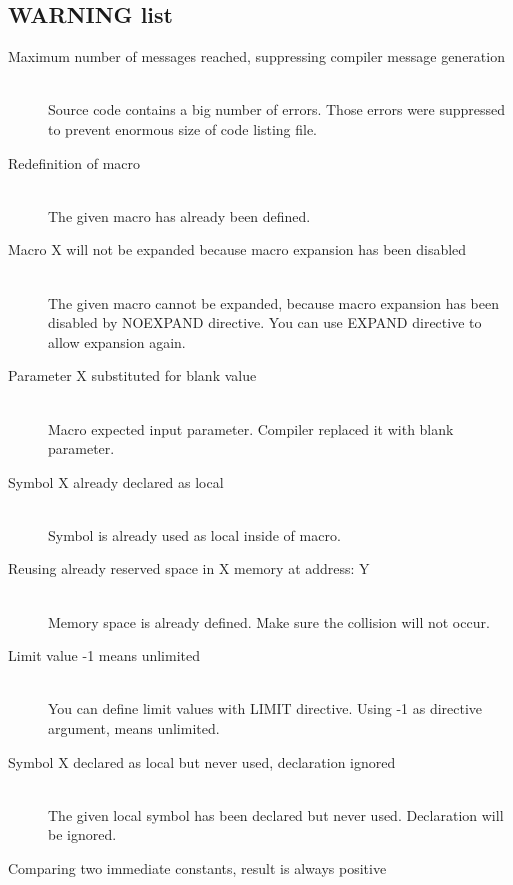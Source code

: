                  \subsection{WARNING list}
                    \begin{description}
                    \item[Maximum number of messages reached, suppressing compiler message generation] \hfill \\
                    Source code contains a big number of errors. Those errors were suppressed to prevent enormous size of code listing file.
                    \item[Redefinition of macro ] \hfill \\
                    The given macro has already been defined.
                    \item[Macro X will not be expanded because macro expansion has been disabled] \hfill \\
                    The given macro cannot be expanded, because macro expansion has been disabled by NOEXPAND directive.
                    You can use EXPAND directive to allow expansion again.
                    \item[Parameter X substituted for blank value ] \hfill \\     %
                    Macro expected input parameter. Compiler replaced it with blank parameter.
                    \item[Symbol X already declared as local ] \hfill \\
                    Symbol is already used as local inside of macro.   %
                    \item[Reusing already reserved space in X memory at address: Y] \hfill \\  %
                    Memory space is already defined. Make sure the collision will not occur.
                    \item[Limit value -1 means unlimited] \hfill \\
                    You can define limit values with LIMIT directive. Using -1 as directive argument, means unlimited.
                    \item[Symbol X declared as local but never used, declaration ignored] \hfill \\
                    The given local symbol has been declared but never used. Declaration will be ignored.
                    \item[Comparing two immediate constants, result is always positive] \hfill \\

\end{description}
